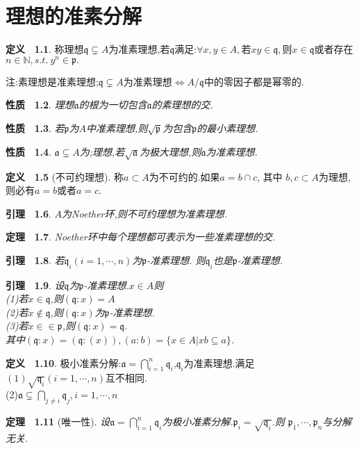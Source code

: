 \documentclass[b5paper,oneside]{ctexbook}
\newcommand{\mf}[1]{\mathfrak{#1}}
\theoremstyle{plain}
\newtheorem{thm}{定理~}[chapter]
\newtheorem{lem}[thm]{引理~}
\newtheorem{prop}[thm]{性质~}
\theoremstyle{definition}
\newtheorem{defn}[thm]{定义~}
\begin{document}
\chapter{理想的准素分解}
\begin{defn}称理想$\mf{q}\subsetneq A$为准素理想,若$\mf{q}$满足:$\forall x,y\in A,$若$xy\in \mf{q},$则$x\in \mf{q}$或者存在$n\in\mathbb{N},s.t.~y^n\in\mf{p}.$
\end{defn}
注:素理想是准素理想;$\mf{q}\subsetneq A$为准素理想$\Leftrightarrow A/\mf{q}$中的零因子都是幂零的.
\begin{prop}理想$\mf{a}$的根为一切包含$\mf{a}$的素理想的交.
\end{prop}
\begin{prop}若$\mf{p}$为$A$中准素理想,则$\sqrt{\mf{p}}$为包含$\mf{p}$的最小素理想.
\end{prop}
\begin{prop} 
$\mf{a}\subsetneq A$为;理想,若$\sqrt{\mf{a}}$为极大理想,则$\mf{a}$为准素理想.
\end{prop}
\begin{defn}[不可约理想]称$a \subset A$为不可约的.如果$a=b\cap c$, 其中 $b,c\subset A$为理想,则必有$a=b$或者$a=c$.
\end{defn}
\begin{lem}$A$为Noether环,则不可约理想为准素理想.
\end{lem}
\begin{thm}Noether环中每个理想都可表示为一些准素理想的交.
\end{thm}
\begin{lem}若$\mf{q}_i(i=1,\cdots,n)$为$\mf{p}$-准素理想. 则$\mf{q}_i$也是$\mf{p}$-准素理想.
\end{lem}
\begin{lem}设$\mf{q}$为$\mf{p}$-准素理想.$x\in A$则\\
(1)若$x \in \mf{q}$,则$(\mf{q}:x)=A$\\
(2)若$x\notin \mf{q}$,则$(\mf{q}:x)$为$\mf{p}$-准素理想.\\
(3)若$x∈\in \mf{p}$,则$(\mf{q}:x)=\mf{q}.$\\
其中$(\mf{q}:x)=(\mf{q}:(x)),(a : b)=\{x \in A|xb\subseteq a\}$.
\end{lem}
\begin{defn}极小准素分解:$\mf{a}=\bigcap_{i=1}^n \mf{q}_i$,$\mf{q}_i$为准素理想.满足\\
$(1)\sqrt{\mf{q}_i}(i=1,\cdots,n)$互不相同.\\
(2)$\mf{a}\subsetneq \bigcap_{j\neq i}\mf{q}_j,i=1,\cdots,n$
\end{defn}
\begin{thm}[唯一性]设$\mf{a}=\bigcap_{i=1}^n \mf{q}_i$为极小准素分解.$\mf{p}_i=\sqrt{\mf{q}_i}$.则 $\mf{p}_1,\cdots,\mf{p}_n$与分解无关.
\end{thm} 
\end{document}
